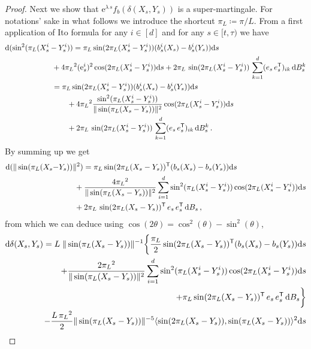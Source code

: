 \documentclass[final,12pt]{colt2023} %
\newcommand{\bes}{\begin{equation}}
\newcommand{\ees}{\end{equation}}
\newcommand{\De}{\mathrm{d}}
\newcommand{\rme}{\mathrm{e}}
\def\eqsp{\;}
\begin{document}
\begin{proof}
 Next we show that $\rme^{\lambda\, s}f_b(\delta (X_s,Y_s))$ is a super-martingale. For notations' sake in what follows we introduce the shortcut $\pi_L\coloneqq \pi/L$.
From a first application of Ito formula for any $i\in[d]$ and for any $s\in[t,\tau)$ we have
\bes
\begin{split}
 \De(\sin^2({\pi_L}& (X^i_s-Y^i_s))= {\pi_L}\sin(2{\pi_L}(X^i_s-Y^i_s))(b^i_s(X_s)-b^i_s(Y_s))\De s\\
&\qquad + 4{\pi_L}^2 (\rme^i_s)^2\cos(2{\pi_L}(X_s^i-Y_s^i))\De s
+2{\pi_L} \,\sin(2{\pi_L}(X_s^i-Y_s^i))\,\sum_{k=1}^d(e_s\,e_s^{{\sf  T}})_{ik}\,\De B^k_s\\
& \qquad = {\pi_L}\sin(2{\pi_L}(X^i_s-Y^i_s))(b^i_s(X_s)-b^i_s(Y_s))\De s\\
& \qquad \qquad +  4{\pi_L}^2 \frac{\sin^2({\pi_L}(X_s^i-Y_s^i))}{\|\sin({\pi_L}(X_s-Y_s))\|^2}\cos(2{\pi_L}(X_s^i-Y_s^i))\De s \\
& \qquad \qquad + 2{\pi_L} \,\sin(2{\pi_L}(X_s^i-Y_s^i))\,\sum_{k=1}^d(e_s\,e_s^{{\sf  T}})_{ik}\,\De B^k_s\,.
\end{split}\ees
By summing up  we get
\bes
\begin{split}
\De(\|\sin({\pi_L}(X_s-&Y_s))\|^2)  = {\pi_L}\sin(2{\pi_L}(X_s-Y_s))^{{\sf  T}}(b_s(X_s)-b_s(Y_s))\De s\\
&  \qquad + \frac{4{\pi_L}^2}{\|\sin({\pi_L}(X_s-Y_s))\|^2}\sum_{i=1}^d\sin^2({\pi_L}(X_s^i-Y_s^i))\cos(2{\pi_L}(X_s^i-Y_s^i)) \De s \\
&  \qquad + 2{\pi_L} \,\sin(2{\pi_L}(X_s-Y_s))^{{\sf  T}}\,e_s\,e_s^{{\sf  T}}\,\De B_s\,,
\end{split}\ees
from which we can deduce using $\cos(2\theta) = \cos^2(\theta) - \sin^2(\theta)$,
\bes
\begin{split}
\De\delta(X_s,Y_s)  =L\eqsp\|\sin({\pi_L}(X_s-Y_s))\|^{-1}\biggl\{\frac{{\pi_L}}{2}\sin(2{\pi_L}(X_s-Y_s))^{{\sf  T}}(b_s(X_s)-b_s(Y_s))\De s\\
+\frac{2{\pi_L}^2}{\|\sin({\pi_L}(X_s-Y_s))\|^2}\sum_{i=1}^d\sin^2({\pi_L}(X_s^i-Y_s^i))\cos(2{\pi_L}(X_s^i-Y_s^i))\De s\\
+{\pi_L}\sin(2{\pi_L}(X_s-Y_s))^{{\sf  T}}\,e_s\,e_s^{{\sf  T}}\,\De B_s\biggr\}\\
-\frac{L\,{\pi_L}^2}{2} \|\sin({\pi_L}(X_s-Y_s))\|^{-5}\langle \sin(2{\pi_L}(X_s-Y_s)),\sin({\pi_L}(X_s-Y_s))\rangle^2\De s
\end{split}
\ees


\end{proof}
\end{document}
